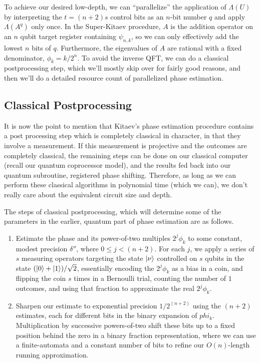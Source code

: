 To achieve our desired low-depth, we can ``parallelize'' the application of
$\Lambda(U)$ by interpreting the
$t = (n+2)s$ control bits as an $n$-bit number $q$ and
apply $\Lambda(A^q)$ only once.
In the Super-Kitaev procedure, $A$ is the addition operator on an $n$ qubit
target register containing $\psi_{n,k}$, so we can
only effectively add the lowest $n$ bits of $q$.
Furthermore, the eigenvalues of $A$ are rational with a fixed
denominator, $\phi_k = k / 2^n$.
To avoid the inverse QFT,
we can do a classical postprocessing step, which we'll mostly skip over
for fairly good reasons, and then we'll do a detailed resource count of
parallelized phase estimation.

\subsection{Classical Postprocessing}

It is now the point to mention that Kitaev's phase estimation procedure
contains a post processing step which is completely classical in
character, in that they involve a measurement. If this measurement is
projective and the outcomes are completely classical, the remaining steps
can be done on our classical computer (recall our quantum coprocessor model),
and the results fed back into our quantum subroutine, registered
phase shifting. Therefore, as long as we can perform these classical
algorithms in polynomial time (which we can), we don't really care
about the equivalent circuit size and depth.

The steps of classical postprocessing, which will determine some of the
parameters in the earlier, quantum part of phase estimation are as follows.

\begin{enumerate}

\item
Estimate the phase and its power-of-two multiples
$2^j \phi_k$ to
some constant, modest precision $\delta''$, where
$0 \le j < (n+2)$. For each $j$, we
apply a series of $s$ measuring operators targeting the state $\left\vert{\nu}\right\rangle$
controlled on $s$ qubits in the state $(\left\vert{0}\right\rangle+\left\vert{1}\right\rangle)/\sqrt{2}$,
essentially encoding the $2^j \phi_k$ as a bias in a coin, and flipping the
coin $s$ times in a Bernoulli trial, counting the number of $1$ outcomes,
and using that fraction to approximate the real $2^j \phi_k$.
\item
Sharpen our estimate to exponential precision $1/2^(n+2)$ using the
$(n+2)$ estimates, each for different bits in the binary expansion of
$phi_k$. Multiplication by successive powers-of-two shift these bits
up to a fixed position behind the zero in a binary fraction representation,
where we can use a finite-automata and a constant number of
bits to refine our $O(n)$-length running approximation.
\end{enumerate}

